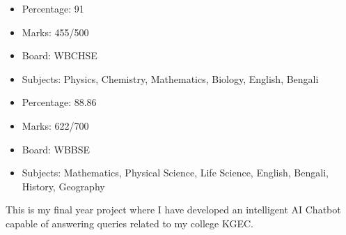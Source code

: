 \documentclass[10pt,legalpaper,ragged2e,withhyper]{altacv}
\begin{document}
\begin{paracol}{2}
    \begin{minipage}[t]{0.2\textwidth}
        \begin{itemize}
            \item Percentage: 91
            \item Marks: 455/500
        \end{itemize}
    \end{minipage}
    \begin{minipage}[t]{0.4\textwidth}
        \begin{itemize}
            \item Board: WBCHSE
            \item Subjects: Physics, Chemistry, Mathematics, Biology, English, Bengali
        \end{itemize}
    \end{minipage}

    \divider
    \begin{minipage}[t]{0.2\textwidth}
        \begin{itemize}
            \item Percentage: 88.86
            \item Marks: 622/700
        \end{itemize}
    \end{minipage}
    \begin{minipage}[t]{0.4\textwidth}
        \begin{itemize}
            \item Board: WBBSE
            \item Subjects: Mathematics, Physical Science, Life Science, English, Bengali, History, Geography
        \end{itemize}
    \end{minipage}

    This is my final year project where I have developed an intelligent AI Chatbot capable of answering queries related to my college KGEC.
    \divider


\end{paracol}
\end{document}
